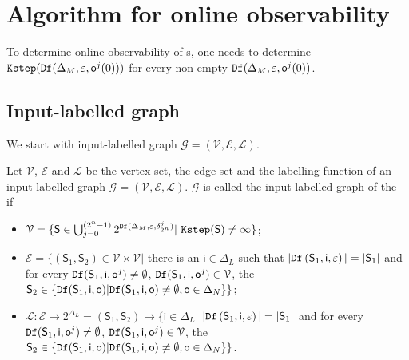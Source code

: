 
\section{Algorithm for online observability}
\label{sec:deter}
To  determine  online observability of \BCN s, one needs to determine ${\tt Kstep}({\tt Df}(\Delta_M,\varepsilon,\mathsf{o}^{j}(0)))$ for every non-empty ${\tt Df}(\Delta_M,\varepsilon, \mathsf{o}^{j}(0))$. 

\subsection{Input-labelled graph}
We start with input-labelled graph $\mathcal{G}=(\mathcal{V}, \mathcal{E}, \mathcal{L})$.

\begin{definition}
Let $\mathcal{V}$, $\mathcal{E}$ and $\mathcal{L}$ be the vertex set, the edge set and the labelling function of an input-labelled graph $\mathcal{G}=(\mathcal{V}, \mathcal{E}, \mathcal{L})$. $\mathcal{G}$ is called the input-labelled graph of the \BCN\, if 
\begin{itemize}
\item  $\mathcal{V}=\{\mathsf{S}\in\bigcup_{j=0}^{(2^{n} -1)} 2^{\Ded(\Delta_M,\varepsilon,\delta^j_{2^{n}} )}|\ \Ks(\mathsf{S})\ne \infty\}$;
\item  $\mathcal{E}=\{(\mathsf{S}_1,\mathsf{S}_2)\in \mathcal{V}\times \mathcal{V}|$ there is an $\mathsf{i} \in \Delta_L$ such that $|{\tt Df}\left(\mathsf{S}_1,\mathsf{i},\varepsilon\right)|=|\mathsf{S}_1|$ and for every ${\tt Df}(\mathsf{S}_1,\mathsf{i},\mathsf{o}^{j})\neq \emptyset$, ${\tt Df}(\mathsf{S}_1,\mathsf{i},\mathsf{o}^{j})\in \mathcal{V}$, the $\mathsf{S}_2\in\{{\tt Df}(\mathsf{S}_1,\mathsf{i},\mathsf{o})| {\tt Df}(\mathsf{S}_1,\mathsf{i},\mathsf{o})\neq \emptyset, \mathsf{o}\in \Delta_N\}\}$;
\item  $\mathcal{L}:\mathcal{E}\mapsto 2^{\Delta_L}=(\mathsf{S}_1,\mathsf{S}_2)\mapsto\{\mathsf{i}\in \Delta_L|$ $|{\tt Df}\left(\mathsf{S}_1,\mathsf{i},\varepsilon\right)|=|\mathsf{S}_1|$ and for every ${\tt Df}(\mathsf{S}_1,\mathsf{i},\mathsf{o}^{j})\neq \emptyset$, ${\tt Df}(\mathsf{S}_1,\mathsf{i},\mathsf{o}^{j})\in \mathcal{V}$, the $\mathsf{S}_2\in\{{\tt Df}(\mathsf{S}_1,\mathsf{i},\mathsf{o})| {\tt Df}(\mathsf{S}_1,\mathsf{i},\mathsf{o})\neq \emptyset, \mathsf{o}\in \Delta_N\}\}$.
 \end{itemize}
\end{definition}

